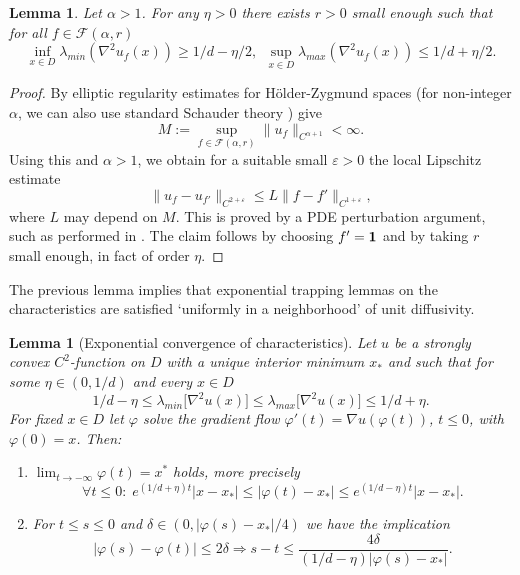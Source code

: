\documentclass{article}
\numberwithin{equation}{section}
\newtheorem{lemma}[satz]{Lemma}
\theoremstyle{definition}
\providecommand{\eps}{\varepsilon}
\renewcommand{\phi}{\varphi}
\providecommand{\abs}[1]{\lvert #1 \rvert}
\renewcommand{\le}{\leqslant}
\renewcommand{\ge}{\geqslant}
\begin{document}
\begin{lemma}\label{lemma-convex}
    Let $\alpha >1$. For any $\eta>0$ there exists $r>0$ small enough such that for all $f\in \mathcal F(\alpha,r)$ 
    \[ \inf_{x\in D}\lambda_{min}(\nabla^2 u_f(x)) \ge 1/d-\eta/2, ~~ \sup_{x\in D}\lambda_{max}(\nabla^2 u_f(x)) \le 1/d+\eta/2.\]
    \end{lemma}
\begin{proof}
By elliptic regularity estimates for H\"older-Zygmund spaces \cite[Chapter 5]{Triebel1978} (for non-integer $\alpha$, we can also use standard Schauder theory \cite{GilbargTrudinger2001}) give
\[ M:=\sup_{f\in\mathcal F(\alpha,r)}\|u_f\|_{C^{\alpha+1}}  <\infty. \]
Using this and $\alpha>1$, we obtain  for a suitable small $\eps>0$  the local Lipschitz estimate
\[ \|u_{f}-u_{f'}\|_{C^{2+\eps}}\le L \|f-f'\|_{C^{1+\eps}},  \]
where $L$ may depend on $M$. This is proved by a PDE perturbation argument, such as performed in \cite{nickl2020convergence}. The claim follows by choosing $f'={\bf 1}$ and by taking $r$ small enough, in fact of order  $\eta$.
\end{proof}

The previous lemma implies that exponential trapping lemmas on the characteristics are satisfied `uniformly in a neighborhood' of unit diffusivity.




\begin{lemma}[Exponential convergence of characteristics]\label{exponential-lemma}
Let $u$ be a strongly convex $C^2$-function on $D$ with a unique interior minimum $x_*$ and such that for some $\eta\in (0,1/d)$ and every $x\in D$
\[1/d -\eta \le \lambda_{min} \big[ \nabla^2 u(x) \big] \le \lambda_{max}\big[ \nabla^2 u(x)\big] \le 1/d +\eta. \]
For fixed $x\in D$ let $\phi$ solve the  gradient flow $\phi'(t)=\nabla u(\phi(t))$, $t\le 0$, with  $\varphi(0)=x$. Then: 
\begin{enumerate}
\item $\lim_{t\to-\infty} \varphi(t) = x^*$ holds, more precisely
\[\forall t\le 0:\;
    e^{(1/d+\eta)t}|x-x_\ast|
    \le
    |\phi(t)-x_\ast|
    \le
    e^{(1/d-\eta)t}|x-x_\ast|.
\]
\item For $t\le s\le 0$ and $\delta\in(0, |\varphi(s)-x_\ast|/4)$ we have the implication
\[
   |\varphi(s)-\varphi(t)|\le 2\delta \Rightarrow
    s-t\le 
    \frac{4 \delta}{(1/d-\eta)\abs{\phi(s)-x_\ast}}.
\]
\end{enumerate}
\end{lemma}
\end{document}
